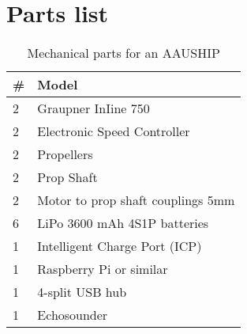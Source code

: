 \section{Parts list}
\begin{table}[htbp]
	\centering
	\begin{tabularx}{\textwidth}{ll}
	\toprule
	\# &  Model \\
	\midrule
	2 & Graupner InIine 750 \\
	2 & Electronic Speed Controller \\
	2 & Propellers \\
	2 & Prop Shaft \\
	2 & Motor to prop shaft couplings 5mm\\
	6 & LiPo 3600 mAh 4S1P batteries \\
	1 & Intelligent Charge Port (ICP) \\
	1 & Raspberry Pi or similar \\
	1 & 4-split USB hub\\
	1 & Echosounder \\
	\bottomrule
	\end{tabularx}
	\caption{Mechanical parts for an AAUSHIP}
\end{table}

